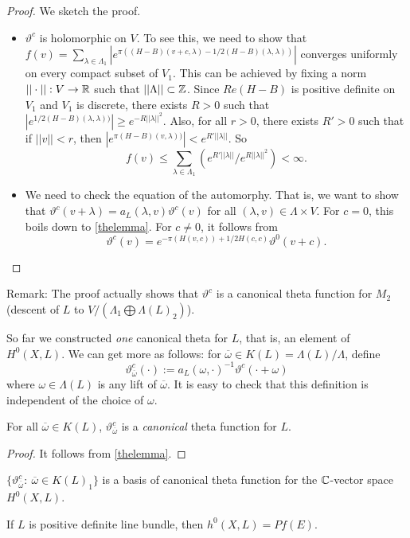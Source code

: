 \begin{proof}
We sketch the proof. 
\begin{itemize}
\item $\vartheta^c$ is holomorphic on $V$. To see this, we need to show that $f(v)=\sum_{\lambda\in \Lambda_1} |e^{\pi((H-B)(v+c,\lambda)-1/2(H-B)(\lambda,\lambda))}|$ converges uniformly on every compact subset of $V_1$. This can be achieved by fixing a norm $||\cdot||:V\to {\mathbb R}$ such that $||\Lambda||\subset {\mathbb Z}$. Since $Re(H-B)$ is positive definite on $V_1$ and $V_1$ is discrete, there exists $R>0$ such that $|e^{1/2(H-B)(\lambda,\lambda))}|\geq e^{-R||\lambda||^2}$. Also, for all $r>0$, there exists $R'>0$ such that if $||v||<r$, then $|e^{\pi(H-B)(v,\lambda))}|<e^{R'||\lambda||}$. So 
$$f(v)\leq \sum_{\lambda\in \Lambda_1} (e^{R'||\lambda||}/e^{R||\lambda||^2})<\infty.$$

\item We need to check the equation of the automorphy. That is, we want to show that $\vartheta^c(v+\lambda)=a_L(\lambda,v)\vartheta^c(v)$ for all $(\lambda,v)\in \Lambda\times V$. For $c=0$, this boils down to \ref{thelemma}. For $c\not=0$, it follows from 
$$\vartheta^c(v)=e^{-\pi(H(v,c))+1/2H(c,c)}\vartheta^0(v+c).$$


\end{itemize}
\end{proof}

Remark: The proof actually shows that $\vartheta^c$ is a canonical theta function for $M_2$ (descent of $L$ to $V/(\Lambda_1\bigoplus \Lambda(L)_2)$). 

So far we constructed \emph{one} canonical theta for $L$, that is, an element of $H^0(X,L)$. We can get more as follows: for $\overline{\omega}\in K(L)=\Lambda(L)/\Lambda$, define 
$$\vartheta_{\overline{\omega}}^c(\cdot):=a_L(\omega,\cdot)^{-1}\vartheta^c(\cdot + \omega)$$
where $\omega\in \Lambda(L)$ is any lift of $\overline{\omega}$. It is easy to check that this definition is independent of the choice of $\omega$. 

\begin{lemma}
For all $\overline{\omega}\in K(L)$, $\vartheta_{\overline{\omega}}^c$ is a \emph{canonical} theta function for $L$. 
\end{lemma}

\begin{proof}
It follows from \ref{thelemma}.
\end{proof}

\begin{theorem}
$\{\vartheta_{\overline{\omega}}^c:\ \overline{\omega}\in K(L)_1\}$ is a basis of canonical theta function for the ${\mathbb C}$-vector space $H^0(X,L)$. 
\end{theorem}

\begin{corollary}
If $L$ is positive definite line bundle, then $h^0(X,L)=Pf(E)$.
\end{corollary}



